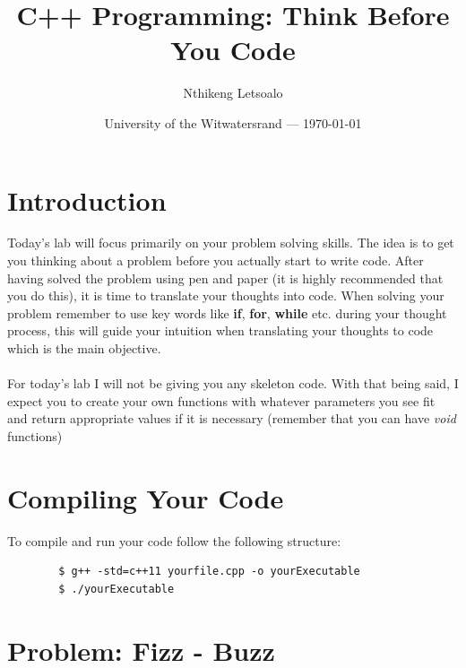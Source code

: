 \documentclass{article}
\title{C++ Programming: Think Before You Code} %
\author{Nthikeng Letsoalo} %
\date{University of the Witwatersrand --- \today} %
\begin{document}
\maketitle %


\section*{Introduction} %

Today's lab will focus primarily on your problem solving skills. The idea is to get you thinking about a problem before you actually start to write code. After having solved the problem using pen and paper (it is highly recommended that you do this), it is time to translate your thoughts into code. When solving your problem remember to use key words like \textbf{if}, \textbf{for}, \textbf{while} etc. during your thought process, this will guide your intuition when translating your thoughts to code which is the main objective. 
\\\\
For today's lab I will not be giving you any skeleton code. With that being said, I expect you to create your own functions with whatever parameters you see fit and return appropriate values if it is necessary (remember that you can have \textit{void} functions)

\section{Compiling Your Code}
To compile and run your code follow the following structure:
\begin{commandline}
	\begin{verbatim}
		$ g++ -std=c++11 yourfile.cpp -o yourExecutable
		$ ./yourExecutable
	\end{verbatim}
\end{commandline}

\section{ Problem: Fizz - Buzz} %
\end{document}
